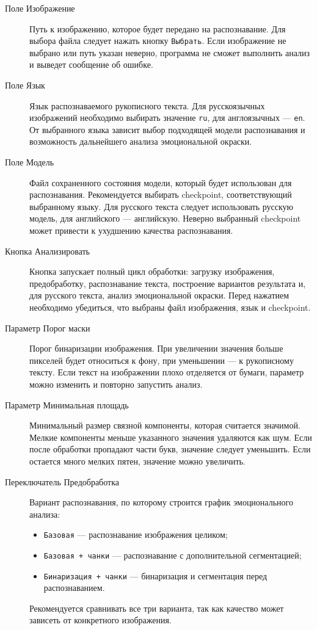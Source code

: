 \documentclass[12pt,a4paper]{article}
\begin{document}
\begin{description}
    \item[Поле Изображение]
    Путь к изображению, которое будет передано на распознавание. Для выбора файла
    следует нажать кнопку \texttt{Выбрать}. Если изображение не выбрано или путь указан
    неверно, программа не сможет выполнить анализ и выведет сообщение об ошибке.

    \item[Поле Язык]
    Язык распознаваемого рукописного текста. Для русскоязычных изображений необходимо
    выбирать значение \texttt{ru}, для англоязычных --- \texttt{en}. От выбранного языка
    зависит выбор подходящей модели распознавания и возможность дальнейшего анализа
    эмоциональной окраски.

    \item[Поле Модель]
    Файл сохраненного состояния модели, который будет использован для распознавания.
    Рекомендуется выбирать checkpoint, соответствующий выбранному языку. Для русского
    текста следует использовать русскую модель, для английского --- английскую.
    Неверно выбранный checkpoint может привести к ухудшению качества распознавания.

    \item[Кнопка Анализировать]
    Кнопка запускает полный цикл обработки: загрузку изображения, предобработку,
    распознавание текста, построение вариантов результата и, для русского текста,
    анализ эмоциональной окраски. Перед нажатием необходимо убедиться, что выбраны
    файл изображения, язык и checkpoint.

    \item[Параметр Порог маски]
    Порог бинаризации изображения. При увеличении значения больше пикселей будет
    относиться к фону, при уменьшении --- к рукописному тексту. Если текст на
    изображении плохо отделяется от бумаги, параметр можно изменить и повторно
    запустить анализ.

    \item[Параметр Минимальная площадь]
    Минимальный размер связной компоненты, которая считается значимой. Мелкие
    компоненты меньше указанного значения удаляются как шум. Если после обработки
    пропадают части букв, значение следует уменьшить. Если остается много мелких
    пятен, значение можно увеличить.

    \item[Переключатель Предобработка]
    Вариант распознавания, по которому строится график эмоционального анализа:
    \begin{itemize}
        \item \texttt{Базовая} --- распознавание изображения целиком;
        \item \texttt{Базовая + чанки} --- распознавание с дополнительной сегментацией;
        \item \texttt{Бинаризация + чанки} --- бинаризация и сегментация перед распознаванием.
    \end{itemize}
    Рекомендуется сравнивать все три варианта, так как качество может зависеть от
    конкретного изображения.
\end{description}
\end{document}
